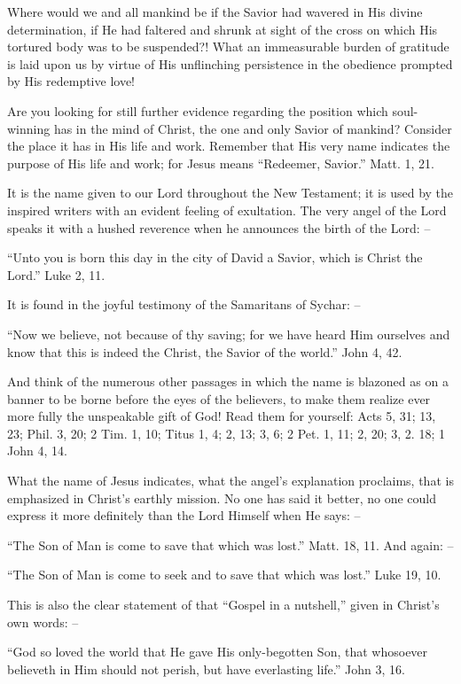\documentclass[
]{book}
\begin{document}
Where would we and all mankind be if the Savior had wavered in His divine determination, if He had faltered and shrunk at sight of the cross on which His tortured body was to be suspended?! What an immeasurable burden of gratitude is laid upon us by virtue of His unflinching persistence in the obedience prompted by His redemptive love!

Are you looking for still further evidence regarding the position which soul-winning has in the mind of Christ, the one and only Savior of mankind? Consider the place it has in His life and work. Remember that His very name indicates the purpose of His life and work; for Jesus means ``Redeemer, Savior.'' Matt. 1, 21.

It is the name given to our Lord throughout the New Testament; it is used by the inspired writers with an evident feeling of exultation. The very angel of the Lord speaks it with a hushed reverence when he announces the birth of the Lord: --

``Unto you is born this day in the city of David a Savior, which is Christ the Lord.'' Luke 2, 11.

It is found in the joyful testimony of the Samaritans of Sychar: --

``Now we believe, not because of thy saving; for we have heard Him ourselves and know that this is indeed the Christ, the Savior of the world.'' John 4, 42.

And think of the numerous other passages in which the name is blazoned as on a banner to be borne before the eyes of the believers, to make them realize ever more fully the unspeakable gift of God! Read them for yourself: Acts 5, 31; 13, 23; Phil. 3, 20; 2 Tim. 1, 10; Titus 1, 4; 2, 13; 3, 6; 2 Pet. 1, 11; 2, 20; 3, 2. 18; 1 John 4, 14.

What the name of Jesus indicates, what the angel's explanation proclaims, that is emphasized in Christ's earthly mission. No one has said it better, no one could express it more definitely than the Lord Himself when He says: --

``The Son of Man is come to save that which was lost.'' Matt. 18, 11. And again: --

``The Son of Man is come to seek and to save that which was lost.'' Luke 19, 10.

This is also the clear statement of that ``Gospel in a nutshell,'' given in Christ's own words: --

``God so loved the world that He gave His only-begotten Son, that whosoever believeth in Him should not perish, but have everlasting life.'' John 3, 16.
\end{document}
